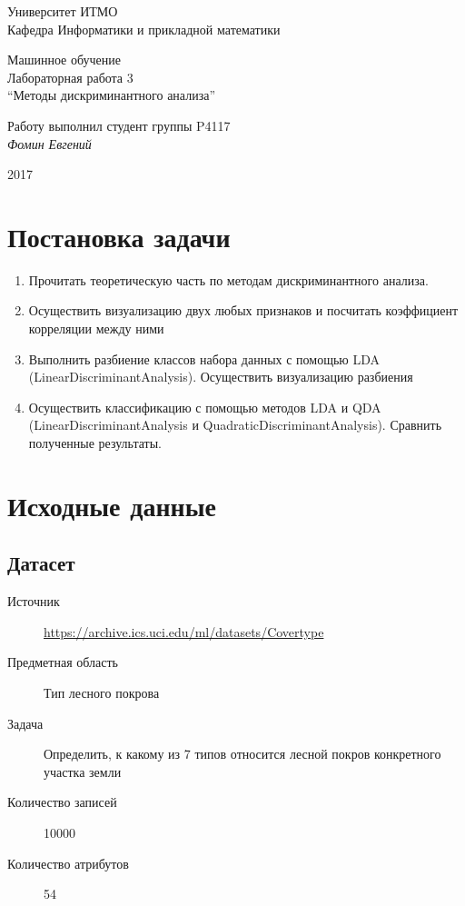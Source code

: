 \documentclass[12pt, a4paper] {article}
\begin{document}
\thispagestyle{empty}
\begin{center}
  {\large
    Университет ИТМО \\
    Кафедра Информатики и прикладной математики \\
  }
\end{center}
\begin{center}
  {\large
    Машинное обучение\\
  }
  {\large
    Лабораторная работа 3\\
    ``Методы дискриминантного анализа''\\
  }
\end{center}
\begin{flushright}
  Работу выполнил студент группы P4117\\
  {\it Фомин Евгений\\
  }
\end{flushright}
\begin{center}
  2017
\end{center}
\newpage

\section{Постановка задачи}

\begin{enumerate}
    \item Прочитать теоретическую часть по методам дискриминантного анализа.
    \item Осуществить визуализацию двух любых признаков и посчитать коэффициент
    корреляции между ними
    \item Выполнить разбиение классов набора данных с помощью LDA
    (LinearDiscriminantAnalysis). Осуществить визуализацию разбиения
    \item Осуществить классификацию с помощью методов LDA и QDA
    (LinearDiscriminantAnalysis и QuadraticDiscriminantAnalysis). Сравнить
    полученные результаты.
\end{enumerate}

\section{Исходные данные}
\subsection{Датасет}
\begin{description}
  \item[Источник] \href{https://archive.ics.uci.edu/ml/datasets/Covertype}{https://archive.ics.uci.edu/ml/datasets/Covertype}
  \item[Предметная область] Тип лесного покрова
  \item[Задача]Определить, к какому из 7 типов относится лесной покров конкретного участка земли
  \item[Количество записей] 10000
  \item[Количество атрибутов] 54
\end{description}
\end{document}

